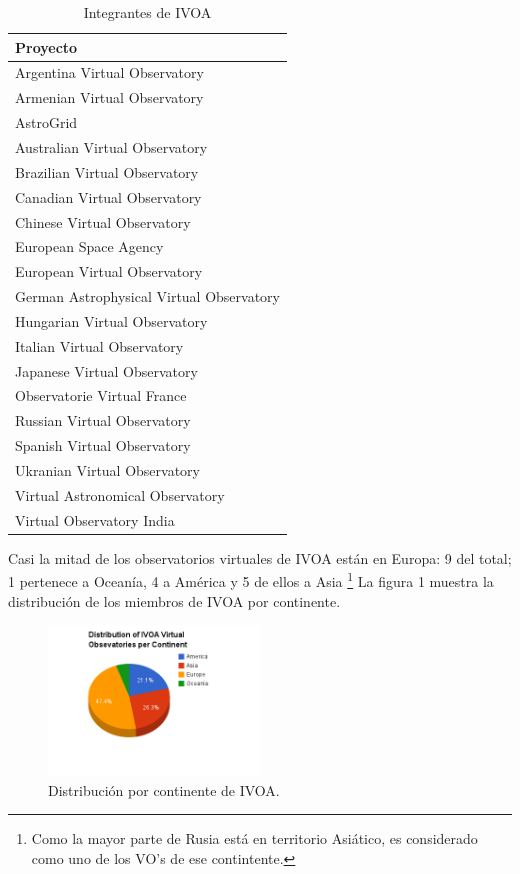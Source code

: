 \begin{table}[h!t]
	\centering
	\begin{tabular}{l} \hline
		\textbf{Proyecto} \\\hline
			Argentina Virtual Observatory\cite{arg} \\
			Armenian Virtual Observatory\cite{arm}\\
			AstroGrid\cite{astrogrid}\\
			Australian Virtual Observatory\cite{aus}\\
			Brazilian Virtual Observatory\cite{bra}\\
			Canadian Virtual Observatory\cite{can}\\
			Chinese Virtual Observatory\cite{china}\\
			European Space Agency\cite{esa}\\
			European Virtual Observatory\cite{euro}\\
			German Astrophysical Virtual Observatory\cite{ger}\\
			Hungarian Virtual Observatory\cite{hun}\\
			Italian Virtual Observatory\cite{ita}\\
			Japanese Virtual Observatory\cite{jap}\\
			Observatorie Virtual France\cite{fra}\\
			Russian Virtual Observatory\cite{rus}\\
			Spanish Virtual Observatory\cite{spa}\\
			Ukranian Virtual Observatory\cite{ukr}\\
			Virtual Astronomical Observatory\cite{usa}\\
			Virtual Observatory India\cite{ind}\\
            \hline
	\end{tabular}
	\caption{Integrantes de IVOA}
	\label{table:integrantes}
\end{table}

Casi la mitad de los observatorios virtuales de IVOA están en Europa: 9 del
total; 1 pertenece a Oceanía, 4 a América y 5 de ellos a Asia \footnote{Como la
mayor parte de Rusia está en territorio Asiático, es considerado como uno de
los VO's de ese contintente.} La figura 1 muestra la distribución de los
miembros de IVOA por continente.
	\begin{figure}[h!t]
		\begin{center}
			\includegraphics[width=0.5\textwidth]{img/ivoa_vos_distribution.png}
			\caption{Distribución por continente de IVOA.}
		\end{center}
	\end{figure}

